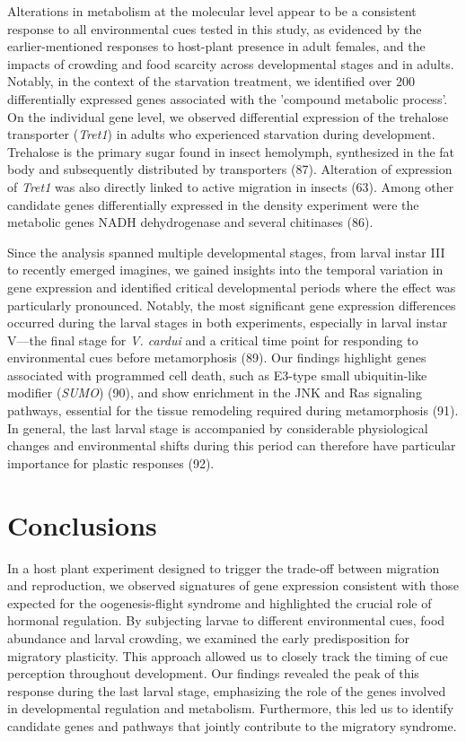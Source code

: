 \documentclass[lineno]{wiley-article}
\begin{document}
Alterations in metabolism at the molecular level appear to be a consistent response to all environmental cues tested in this study, as evidenced by the earlier-mentioned responses to host-plant presence in adult females, and the impacts of crowding and food scarcity across developmental stages and in adults. Notably, in the context of the starvation treatment, we identified over 200 differentially expressed genes associated with the 'compound metabolic process'. On the individual gene level, we observed differential expression of the trehalose transporter (\textit{Tret1}) in adults who experienced starvation during development. Trehalose is the primary sugar found in insect hemolymph, synthesized in the fat body and subsequently distributed by transporters (87). Alteration of expression of \textit{Tret1} was also directly linked to active migration in insects (63). Among other candidate genes differentially expressed in the density experiment were the metabolic genes NADH dehydrogenase and several chitinases (86). 

Since the analysis spanned multiple developmental stages, from larval instar III to recently emerged imagines, we gained insights into the temporal variation in gene expression and identified critical developmental periods where the effect was particularly pronounced. Notably, the most significant gene expression differences occurred during the larval stages in both experiments, especially in larval instar V—the final stage for \textit{V. cardui} and a critical time point for responding to environmental cues before metamorphosis (89). Our findings highlight genes associated with programmed cell death, such as E3-type small ubiquitin-like modifier (\textit{SUMO}) (90), and show enrichment in the JNK and Ras signaling pathways, essential for the tissue remodeling required during metamorphosis (91). In general, the last larval stage is accompanied by considerable physiological changes and environmental shifts during this period can therefore have particular importance for plastic responses (92).

\section{Conclusions}
In a host plant experiment designed to trigger the trade-off between migration and reproduction, we observed signatures of gene expression consistent with those expected for the oogenesis-flight syndrome and highlighted the crucial role of hormonal regulation. By subjecting larvae to different environmental cues, food abundance and larval crowding, we examined the early predisposition for migratory plasticity. This approach allowed us to closely track the timing of cue perception throughout development. Our findings revealed the peak of this response during the last larval stage, emphasizing the role of the genes involved in developmental regulation and metabolism. Furthermore, this led us to identify candidate genes and pathways that jointly contribute to the migratory syndrome.
\end{document}
